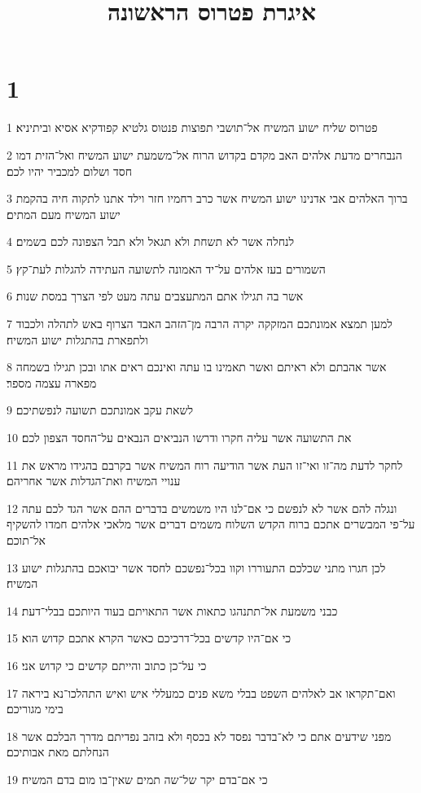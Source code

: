 

\title{איגרת פטרוס הראשונה}


\chapter{1}

\par 1 פטרוס שליח ישוע המשיח אל־תושבי תפוצות פנטוס גלטיא קפודקיא אסיא וביתיניא׃
\par 2 הנבחרים מדעת אלהים האב מקדם בקדוש הרוח אל־משמעת ישוע המשיח ואל־הזית דמו חסד ושלום למכביר יהיו לכם׃
\par 3 ברוך האלהים אבי אדנינו ישוע המשיח אשר כרב רחמיו חזר וילד אתנו לתקוה חיה בהקמת ישוע המשיח מעם המתים׃
\par 4 לנחלה אשר לא תשחת ולא תגאל ולא תבל הצפונה לכם בשמים׃
\par 5 השמורים בעז אלהים על־יד האמונה לתשועה העתידה להגלות לעת־קץ׃
\par 6 אשר בה תגילו אתם המתעצבים עתה מעט לפי הצרך במסת שנות׃
\par 7 למען תמצא אמונתכם המזקקה יקרה הרבה מן־הזהב האבד הצרוף באש לתהלה ולכבוד ולתפארת בהתגלות ישוע המשיח׃
\par 8 אשר אהבתם ולא ראיתם ואשר תאמינו בו עתה ואינכם ראים אתו ובכן תגילו בשמחה מפארה עצמה מספר׃
\par 9 לשאת עקב אמונתכם תשועה לנפשתיכם׃
\par 10 את התשועה אשר עליה חקרו ודרשו הנביאים הנבאים על־החסד הצפון לכם׃
\par 11 לחקר לדעת מה־זו ואי־זו העת אשר הודיעה רוח המשיח אשר בקרבם בהגידו מראש את ענויי המשיח ואת־הגדלות אשר אחריהם׃
\par 12 ונגלה להם אשר לא לנפשם כי אם־לנו היו משמשים בדברים ההם אשר הגד לכם עתה על־פי המבשרים אתכם ברוח הקדש השלוח משמים דברים אשר מלאכי אלהים חמדו להשקיף אל־תוכם׃
\par 13 לכן חגרו מתני שכלכם התעוררו וקוו בכל־נפשכם לחסד אשר יבואכם בהתגלות ישוע המשיח׃
\par 14 כבני משמעת אל־תתנהגו כתאות אשר התאויתם בעוד היותכם בבלי־דעת׃
\par 15 כי אם־היו קדשים בכל־דרכיכם כאשר הקרא אתכם קדוש הוא׃
\par 16 כי על־כן כתוב והייתם קדשים כי קדוש אני׃
\par 17 ואם־תקראו אב לאלהים השפט בבלי משא פנים כמעללי איש ואיש התהלכו־נא ביראה בימי מגוריכם׃
\par 18 מפני שידעים אתם כי לא־בדבר נפסד לא בכסף ולא בזהב נפדיתם מדרך הבלכם אשר הנחלתם מאת אבותיכם׃
\par 19 כי אם־בדם יקר של־שה תמים שאין־בו מום בדם המשיח׃
